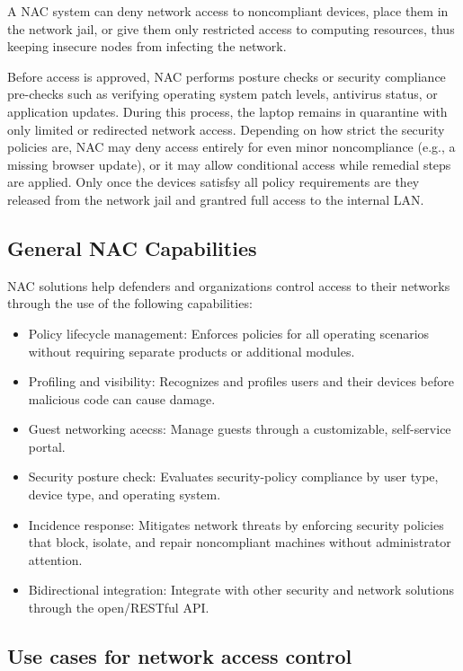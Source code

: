 A NAC system can deny network access to noncompliant devices, place them in the network jail, or give them only restricted access to computing resources, thus keeping insecure nodes from infecting the network.

Before access is approved, NAC performs posture checks or security compliance pre-checks such as verifying operating system patch levels, antivirus status, or application updates. During this process, the laptop remains in quarantine with only limited or redirected network access. Depending on how strict the security policies are, NAC may deny access entirely for even minor noncompliance (e.g., a missing browser update), or it may allow conditional access while remedial steps are applied. Only once the devices satisfsy all policy requirements are they released from the network jail and grantred full access to the internal LAN.

\subsection{General NAC Capabilities}
NAC solutions help defenders and organizations control access to their networks through the use of the following capabilities:
\begin{itemize}
    \item Policy lifecycle management: Enforces policies for all operating scenarios without requiring separate products or additional modules.
    \item Profiling and visibility: Recognizes and profiles users and their devices before malicious code can cause damage.
    \item Guest networking acecss: Manage guests through a customizable, self-service portal.
\end{itemize}
\begin{itemize}
    \item Security posture check: Evaluates security-policy compliance by user type, device type, and operating system.
    \item Incidence response: Mitigates network threats by enforcing security policies that block, isolate, and repair noncompliant machines without administrator attention.
    \item Bidirectional integration: Integrate with other security and network solutions through the open/RESTful API.
\end{itemize}

\subsection{Use cases for network access control}

